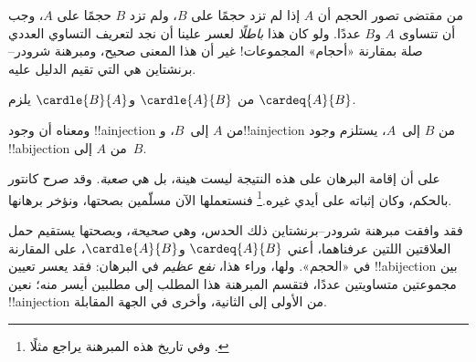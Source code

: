 \documentclass[../../../include/open-logic-section]{subfiles}
\begin{document}


\begin{explain}
من مقتضى تصور الحجم أن $A$ إذا لم تزد حجمًا على $B$، ولم تزد $B$ حجمًا على $A$، وجب أن تتساوى $A$ و$B$ عددًا. ولو كان هذا \emph{باطلًا} لعسر علينا أن نجد لتعريف التساوي العددي صلة بمقارنة «أحجام» المجموعات!{} غير أن هذا المعنى صحيح، ومبرهنة شرودر–برنشتاين هي التي تقيم الدليل عليه.
\end{explain}

\begin{thm}
من $\cardle{A}{B}$ و$\cardle{B}{A}$ يلزم $\cardeq{A}{B}$.
\end{thm}

\begin{explain}
ومعناه أن وجود !!a{injection} من $A$ إلى~$B$، و!!a{injection} من $B$ إلى~$A$، يستلزم وجود !!a{bijection} من $A$ إلى~$B$.

على أن إقامة البرهان على هذه النتيجة ليست هينة، بل هي \emph{صعبة}. وقد صرح كانتور بالحكم، وكان إثباته على أيدي غيره.\footnote{وفي تاريخ هذه المبرهنة يراجع مثلًا \citet[ص~165--6]{Potter2004}.}
%
فنستعملها الآن مسلّمين بصحتها، ونؤخر برهانها.

فقد وافقت مبرهنة شرودر–برنشتاين ذلك الحدس، وهي \emph{صحيحة}، وبصحتها يستقيم حمل العلاقتين اللتين عرفناهما، أعني $\cardeq{A}{B}$ و$\cardle{A}{B}$، على المقارنة في «الحجم». ولها، وراء هذا، \emph{نفع عظيم} في البرهان: فقد يعسر تعيين !!a{bijection} بين مجموعتين متساويتين عددًا، فتقسم المبرهنة هذا المطلب إلى مطلبين أيسر منه؛ نعين !!a{injection} من الأولى إلى الثانية، وأخرى في الجهة المقابلة.
\end{explain}
\end{document}
